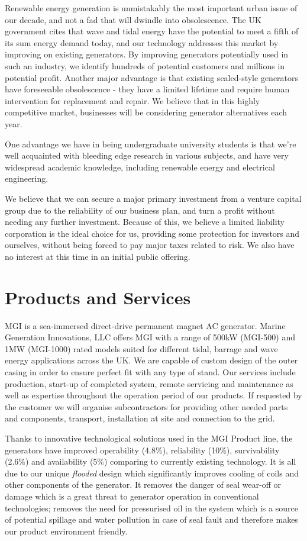 \documentclass[a4paper,11pt]{article}
\begin{document}
Renewable energy generation is unmistakably the most important urban issue of our decade, and not a fad that will dwindle into obsolescence. The UK government cites that wave and tidal energy have the potential to meet a fifth of its sum energy demand today, and our technology addresses this market by improving on existing generators. By improving generators potentially used in such an industry, we identify hundreds of potential customers and millions in potential profit. Another major advantage is that existing sealed-style generators have foreseeable obsolescence - they have a limited lifetime and require human intervention for replacement and repair. We believe that in this highly competitive market, businesses will be considering generator alternatives each year.

One advantage we have in being undergraduate university students is that we're well acquainted with bleeding edge research in various subjects, and have very widespread academic knowledge, including renewable energy and electrical engineering.

We believe that we can secure a major primary investment from a venture capital group due to the reliability of our business plan, and turn a profit without needing any further investment. Because of this, we believe a limited liability corporation is the ideal choice for us, providing some protection for investors and ourselves, without being forced to pay major taxes related to risk. We also have no interest at this time in an initial public offering.
\pagebreak

\section{Products and Services}
MGI is a sea-immersed direct-drive permanent magnet AC generator. Marine Generation Innovations, LLC offers MGI with a range of 500kW (MGI-500) and 1MW (MGI-1000) rated models suited for different tidal, barrage and wave energy applications across the UK. We are capable of custom design of the outer casing in order to ensure perfect fit with any type of stand. Our services include production, start-up of completed system, remote servicing and maintenance as well as expertise throughout the operation period of our products. If requested by the customer we will organise subcontractors for providing other needed parts and components, transport, installation at site and connection to the grid. 

Thanks to innovative technological solutions used in the MGI Product line, the generators have improved operability (4.8\%), reliability (10\%), survivability (2.6\%) and availability (5\%) comparing to currently existing technology. It is all due to our unique \textit{flooded} design which significantly improves cooling of coils and other components of the generator. It removes the danger of seal wear-off or damage which is a great threat to generator operation in conventional technologies; removes the need for pressurised oil in the system which is a source of potential spillage and water pollution in case of seal fault and therefore makes our product environment friendly.
\end{document}
